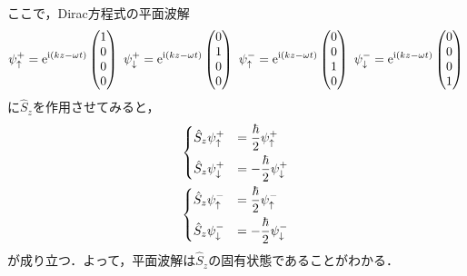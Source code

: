 \documentclass{report}
\begin{document}
  ここで，Dirac方程式の平面波解
  \begin{align}
    \psi_{\uparrow}^{+}
    =
    \e^{\i(kz-\omega t)}
    \begin{pmatrix}
      1\\0\\0\\0
    \end{pmatrix}\ 
    \psi_{\downarrow}^{+}
    =
    \e^{\i(kz-\omega t)}
    \begin{pmatrix}
      0\\1\\0\\0
    \end{pmatrix}\ 
    \psi_{\uparrow}^{-}
    =
    \e^{\i(kz-\omega t)}
    \begin{pmatrix}
      0\\0\\1\\0
    \end{pmatrix}\ 
    \psi_{\downarrow}^{-}
    =
    \e^{\i(kz-\omega t)}
    \begin{pmatrix}
      0\\0\\0\\1
    \end{pmatrix}
  \end{align}
  に$\hat{S}_z$を作用させてみると，
  \begin{align}
    \begin{dcases}
      \hat{S}_z \psi^{+}_{\uparrow} &= \frac{\hbar}{2}\psi^{+}_{\uparrow}\\
      \hat{S}_z \psi^{+}_{\downarrow} &= -\frac{\hbar}{2}\psi^{+}_{\downarrow}
    \end{dcases}\\
    \begin{dcases}
      \hat{S}_z \psi^{-}_{\uparrow} &= \frac{\hbar}{2}\psi^{-}_{\uparrow}\\
      \hat{S}_z \psi^{-}_{\downarrow} &= -\frac{\hbar}{2}\psi^{-}_{\downarrow}
    \end{dcases}
  \end{align}
  が成り立つ．よって，平面波解は$\hat{S}_z$の固有状態であることがわかる．
\end{document}
